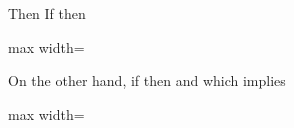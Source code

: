 \documentclass[11pt,oneside]{article}
\begin{document}
\begin{BookBody}
\noindent Then  If  then

\begin{center}\begin{adjustbox}{max width=\linewidth}\end{adjustbox}\end{center}

\noindent On the other hand, if  then  and  which implies

\begin{center}\begin{adjustbox}{max width=\linewidth}\end{adjustbox}\end{center}

\end{BookBody}

\BookNarrativetrue
\end{document}
